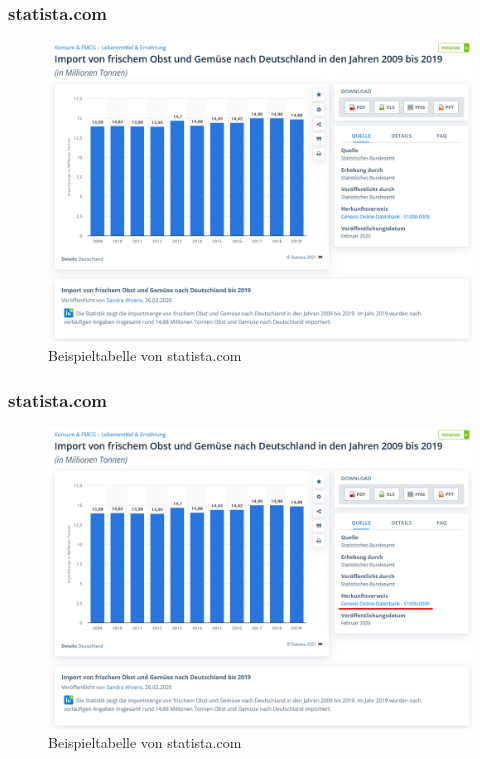 \documentclass{beamer}
\begin{document}
\begin{frame}
	\frametitle{statista.com}
	\begin{figure}[h]
		\caption{Beispieltabelle von statista.com}
		\centering
		\includegraphics[scale=0.3]{5_Destatis_Report}
	\end{figure}
\end{frame}

\begin{frame}
	\frametitle{statista.com}
	\begin{figure}[h]
		\caption{Beispieltabelle von statista.com}
		\centering
		\includegraphics[scale=0.3]{5_Destatis_Report_highlightet}
	\end{figure}
\end{frame}
\end{document}
